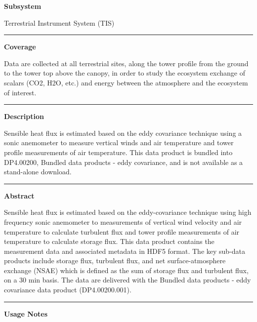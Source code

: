 \documentclass[]{article}
\begin{document}
\textbf{Subsystem}

Terrestrial Instrument System (TIS)

\begin{center}\rule{0.5\linewidth}{\linethickness}\end{center}

\textbf{Coverage}

Data are collected at all terrestrial sites, along the tower profile
from the ground to the tower top above the canopy, in order to study the
ecosystem exchange of scalars (CO2, H2O, etc.) and energy between the
atmosphere and the ecosystem of interest.

\begin{center}\rule{0.5\linewidth}{\linethickness}\end{center}

\textbf{Description}

Sensible heat flux is estimated based on the eddy covariance technique
using a sonic anemometer to measure vertical winds and air temperature
and tower profile measurements of air temperature. This data product is
bundled into DP4.00200, Bundled data products - eddy covariance, and is
not available as a stand-alone download.

\begin{center}\rule{0.5\linewidth}{\linethickness}\end{center}

\textbf{Abstract}

Sensible heat flux is estimated based on the eddy-covariance technique
using high frequency sonic anemometer to measurements of vertical wind
velocity and air temperature to calculate turbulent flux and tower
profile measurements of air temperature to calculate storage flux. This
data product contains the measurement data and associated metadata in
HDF5 format. The key sub-data products include storage flux, turbulent
flux, and net surface-atmosphere exchange (NSAE) which is defined as the
sum of storage flux and turbulent flux, on a 30 min basis. The data are
delivered with the Bundled data products - eddy covariance data product
(DP4.00200.001).

\begin{center}\rule{0.5\linewidth}{\linethickness}\end{center}

\textbf{Usage Notes}
\end{document}
